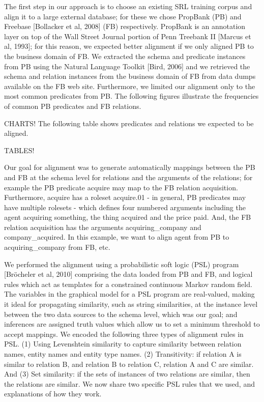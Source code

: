 The first step in our approach is to choose an existing SRL training corpus and align it to a large external database; for these we chose PropBank (PB) and Freebase [Bollacker et al, 2008] (FB) respectively.  PropBank is an annotation layer on top of the Wall Street Journal portion of Penn Treebank II [Marcus et al, 1993]; for this reason, we expected better alignment if we only aligned PB to the business domain of FB.  We extracted the schema and predicate instances from PB using the Natural Language Toolkit [Bird, 2006] and we retrieved the schema and relation instances from the business domain of FB from data dumps available on the FB web site.  Furthermore, we limited our alignment only to the most common predicates from PB.  The following figures illustrate the frequencies of common PB predicates and FB relations.

CHARTS! 
The following table shows predicates and relations we expected to be aligned.

TABLES!

Our goal for alignment was to generate automatically mappings between the PB and FB at the schema level for relations and the arguments of the relations; for example the PB predicate acquire may map to the FB relation acquisition.  Furthermore, acquire has a roleset acquire.01 - in general, PB predicates may have multiple rolesets - which defines four numbered arguments including the agent acquiring something, the thing acquired and the price paid.  And, the FB relation acquisition has the arguments acquiring\_company and company\_acquired.  In this example, we want to align agent from PB to acquiring\_company from FB, etc. 

We performed the alignment using a probabilistic soft logic (PSL) program [Bröcheler et al, 2010] comprising the data loaded from PB and FB, and logical rules which act as templates for a constrained continuous Markov random field.  The variables in the graphical model for a PSL program are real-valued, making it ideal for propagating similarity, such as string similarities, at the instance level between the two data sources to the schema level, which was our goal; and inferences are assigned truth values which allow us to set a minimum threshold to accept mappings.  We encoded the following three types of alignment rules in PSL.  (1) Using Levenshtein similarity to capture similarity between relation names, entity names and entity type names.  (2) Transitivity:  if relation A is similar to relation B, and relation B to relation C, relation A and C are similar.  And (3) Set similarity:  if the sets of instances of two relations are similar, then the relations are similar.  We now share two specific PSL rules that we used, and explanations of how they work.

